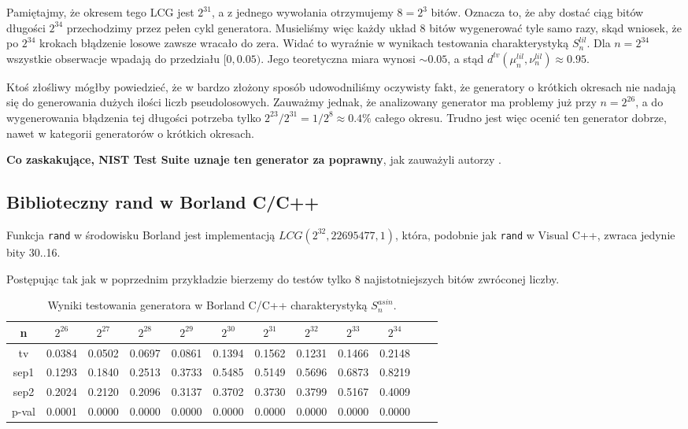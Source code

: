 \documentclass[a4paper,11pt,twoside]{book}
\newcommand{\Slil}[1]{S^{lil}_#1}
\newcommand{\Sasin}[1]{S^{asin}_#1}
\theoremstyle{definition}
\begin{document}
Pamiętajmy, że okresem tego LCG jest $2^{31}$, a z jednego wywołania otrzymujemy $8 = 2^3$ bitów. Oznacza to, że aby dostać ciąg bitów długości $2^{34}$ przechodzimy przez pełen cykl generatora. Musieliśmy więc każdy układ 8 bitów wygenerować tyle samo razy, skąd wniosek, że po $2^{34}$ krokach błądzenie losowe zawsze wracało do zera. Widać to wyraźnie w wynikach testowania charakterystyką $\Slil{n}$. Dla $n=2^{34}$ wszystkie obserwacje wpadają do przedziału $[0, 0.05)$. Jego teoretyczna miara wynosi $\sim 0.05$, a stąd $d^{tv}(\mu^{lil}_n, \nu^{lil}_n) \approx 0.95$.

Ktoś złośliwy mógłby powiedzieć, że w bardzo złożony sposób udowodniliśmy oczywisty fakt, że generatory o krótkich okresach nie nadają się do generowania dużych ilości liczb pseudolosowych. Zauważmy jednak, że analizowany generator ma problemy już przy $n=2^{26}$, a do wygenerowania błądzenia tej długości potrzeba tylko $2^{23} / 2^{31} = 1/2^8 \approx 0.4\%$ całego okresu. Trudno jest więc ocenić ten generator dobrze, nawet w kategorii generatorów o krótkich okresach.

\textbf{Co zaskakujące, NIST Test Suite uznaje ten generator za poprawny}, jak zauważyli autorzy \cite{wang-nic}.

\FloatBarrier
\subsection{Biblioteczny rand w Borland C/C++}
Funkcja \texttt{rand} w środowisku Borland jest implementacją $LCG(2^{32}, 22695477, 1)$, która, podobnie jak \texttt{rand} w Visual C++, zwraca jedynie bity 30..16.

Postępując tak jak w poprzednim przykładzie bierzemy do testów tylko 8 najistotniejszych bitów zwróconej liczby.
\begin{table}[ht!]
\centering
 \caption{Wyniki testowania generatora w Borland C/C++ charakterystyką $\Sasin{n}$.}
 \label{tab:borland_asin}
\begin{tabular} {||c|c|c|c|c|c|c|c|c|c|c|c||}  
 \hline
     n &  $2^{26}$ &  $2^{27}$ &  $2^{28}$ &  $2^{29}$ &  $2^{30}$ &  $2^{31}$ &  $2^{32}$ &  $2^{33}$ &  $2^{34}$\\ \hline
     tv &  0.0384 &  0.0502 &  0.0697 &  0.0861 &  0.1394 &  0.1562 &  0.1231 &  0.1466 &  0.2148\\ \hline
   sep1 &  0.1293 &  0.1840 &  0.2513 &  0.3733 &  0.5485 &  0.5149 &  0.5696 &  0.6873 &  0.8219\\ \hline
   sep2 &  0.2024 &  0.2120 &  0.2096 &  0.3137 &  0.3702 &  0.3730 &  0.3799 &  0.5167 &  0.4009\\ \hline
  p-val &  0.0001 &  0.0000 &  0.0000 &  0.0000 &  0.0000 &  0.0000 &  0.0000 &  0.0000 &  0.0000\\ \hline
\end{tabular}  
\end{table}
\end{document}
